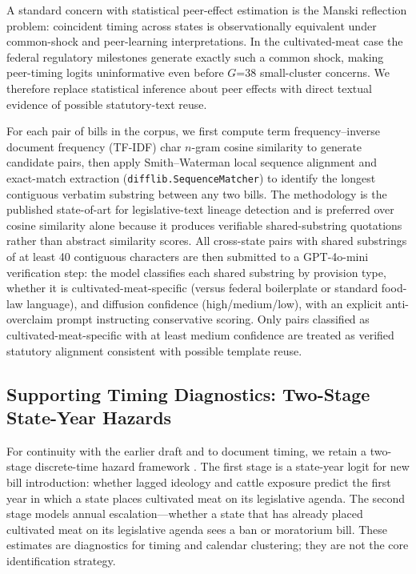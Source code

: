 \documentclass[12pt]{article}
\begin{document}
A standard concern with statistical peer-effect estimation is the Manski reflection problem: coincident timing across states is observationally equivalent under common-shock and peer-learning interpretations.  In the cultivated-meat case the federal regulatory milestones generate exactly such a common shock, making peer-timing logits uninformative even before $G$=38 small-cluster concerns.  We therefore replace statistical inference about peer effects with direct textual evidence of possible statutory-text reuse.

For each pair of bills in the corpus, we first compute term frequency--inverse document frequency (TF-IDF) char $n$-gram cosine similarity to generate candidate pairs, then apply Smith--Waterman local sequence alignment \citep{smith1981identification} and exact-match extraction (\texttt{difflib.SequenceMatcher}) to identify the longest contiguous verbatim substring between any two bills.  The methodology is the published state-of-art for legislative-text lineage detection \citep{hertel2014whoseinterests,linder2020textaspolicy} and is preferred over cosine similarity alone because it produces verifiable shared-substring quotations rather than abstract similarity scores.  All cross-state pairs with shared substrings of at least 40 contiguous characters are then submitted to a GPT-4o-mini verification step: the model classifies each shared substring by provision type, whether it is cultivated-meat-specific (versus federal boilerplate or standard food-law language), and diffusion confidence (high/medium/low), with an explicit anti-overclaim prompt instructing conservative scoring.  Only pairs classified as cultivated-meat-specific with at least medium confidence are treated as verified statutory alignment consistent with possible template reuse.

\subsection{Supporting Timing Diagnostics: Two-Stage State-Year Hazards}

For continuity with the earlier draft and to document timing, we retain a two-stage discrete-time hazard framework \citep{berry1990state,angrist2009mostly}.  The first stage is a state-year logit for new bill introduction: whether lagged ideology and cattle exposure predict the first year in which a state places cultivated meat on its legislative agenda.  The second stage models annual escalation---whether a state that has already placed cultivated meat on its legislative agenda sees a ban or moratorium bill.  These estimates are diagnostics for timing and calendar clustering; they are not the core identification strategy.
\end{document}
